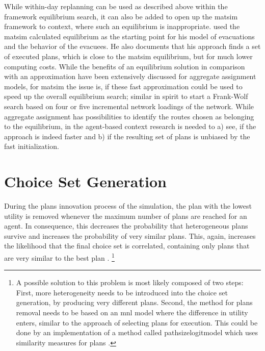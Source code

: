 While within-day replanning can be used as described above within the framework equilibrium search, it can also be added to open up the \gls{matsim} framework to context, where such an equilibrium is inappropriate. 
\citet[][]{Dobler_PhDThesis_2013} used the \gls{matsim} calculated equilibrium as the starting point for his model of evacuations and the behavior of the evacuees. 
He also documents that his approach finds a set of executed plans, which is close to the \gls{matsim} equilibrium, but for much lower computing costs. 
While the benefits of an equilibrium solution in comparison with an approximation have been extensively discussed for aggregate assignment models, for \gls{matsim} the issue is, if these fast approximation could be used to speed up the overall equilibrium search; similar in spirit to start a Frank-Wolf search based on four or five incremental network loadings of the network. 
While aggregate assignment has possibilities to identify the routes chosen as belonging to the equilibrium, in the agent-based context research is needed to a) see, if the approach is indeed faster and b) if the resulting set of plans is unbiased by the fast initialization. 

\section{Choice Set Generation}
\label{sec:choicesets}


During the plans innovation process of the simulation, the plan with the lowest utility is removed whenever the maximum number of plans are reached for an agent. In consequence, this decreases the probability that heterogeneous plans survive and increases the probability of very similar plans. This, again, increases the likelihood that the final choice set is correlated, \ie containing only plans that are very similar to the best plan \citep[see][for a review on correlation of 
 routes]{Prato2009ChoiceModellingSurvey}.%
 \footnote{
 A possible solution to this problem is most likely composed of two steps:
 First, more heterogeneity needs to be introduced into the choice set generation, \eg by producing very different plans.
 Second, the method for plans removal needs to be based on an \gls{mnl} model where the difference in utility enters, similar to the approach of selecting plans for execution. This could be done by an implementation of a method called \gls{pathsizelogitmodel} which uses similarity measures for plans \citep[see][for a possible solution in route choice]{FrejingerBierlaire2007PathSizeLogit, BenAkivaBierlaiere1999DiscreteChoice}.
 }

